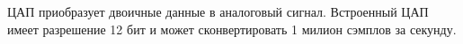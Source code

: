
ЦАП приобразует двоичные данные в аналоговый сигнал. Встроенный ЦАП имеет разрешение 12 бит
и может сконвертировать 1 милион сэмплов за секунду.
